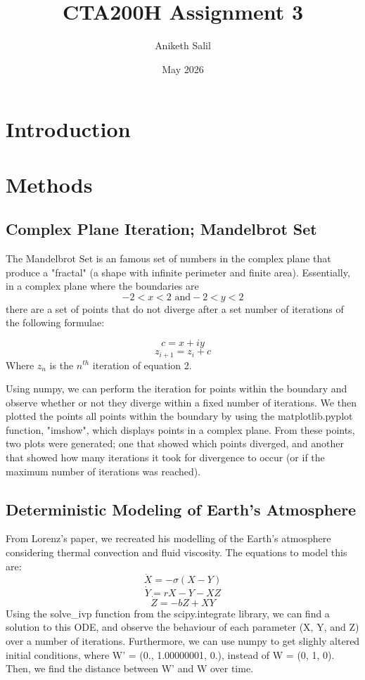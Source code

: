 \documentclass{article}
\title{CTA200H Assignment 3}
\author{Aniketh Salil}
\date{May 2026}
\begin{document}
\maketitle
\section{Introduction}

\section{Methods}
\subsection{Complex Plane Iteration; Mandelbrot Set}
The Mandelbrot Set is an famous set of numbers in the complex plane that produce a "fractal" (a shape with infinite perimeter and finite area). Essentially, in a complex plane where the boundaries are
\begin{equation}
    -2 < x < 2 \text{ and} -2 < y < 2
\end{equation}
there are a set of points that do not diverge after a set number of iterations of the following formulae:

\begin{equation}
    c = x + iy
\end{equation}
\begin{equation}
    z_{i+1} = z_i + c
\end{equation}
Where $z_n$ is the $n^{th}$ iteration of equation 2.

Using numpy, we can perform the iteration for points within the boundary and observe whether or not they diverge within a fixed number of iterations. We then plotted the points all points within the boundary by using the matplotlib.pyplot function, "imshow", which displays points in a complex plane. From these points, two plots were generated; one that showed which points diverged, and another that showed how many iterations it took for divergence to occur (or if the maximum number of iterations was reached).

\subsection{Deterministic Modeling of Earth's Atmosphere}
From Lorenz's paper, we recreated his modelling of the Earth's atmosphere considering thermal convection and fluid viscosity. The equations to model this are:
\begin{equation}
\dot{X} = -\sigma(X - Y)
\end{equation}
\begin{equation}
\dot{Y} = rX - Y - XZ
\end{equation}
\begin{equation}
\dot{Z} = -bZ + XY
\end{equation}
Using the solve\_ivp function from the scipy.integrate library, we can find a solution to this ODE, and observe the behaviour of each parameter (X, Y, and Z) over a number of iterations.
Furthermore, we can use numpy to get slighly altered initial conditions, where W' = (0., 1.00000001, 0.), instead of W = (0, 1, 0). Then, we find the distance between W' and W over time. 
\end{document}
